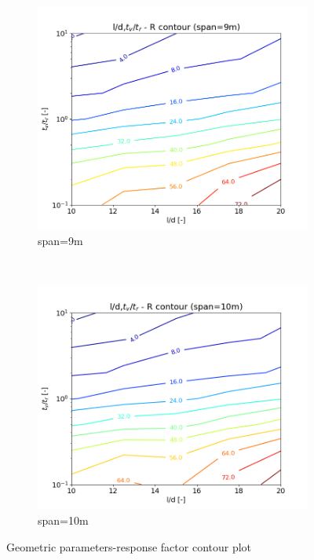 \begin{figure}
\begin{subfigure}[b]{.49\textwidth}
  \centering
  \includegraphics[width=.99\linewidth]{images/l2d,gamma_R_9m.png}
  \caption{span=9m}
\end{subfigure}
~
\begin{subfigure}[b]{.49\textwidth}
  \centering
  \includegraphics[width=.99\linewidth]{images/l2d,gamma_R_10m.png}
  \caption{span=10m}
\end{subfigure}

\caption{Geometric parameters-response factor contour plot}
\label{fig:geom-R_contour}
\end{figure} 


